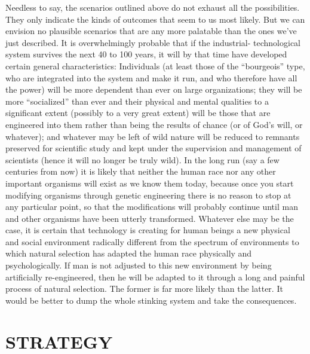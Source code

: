  Needless to say, the scenarios outlined above do not exhaust all the possibilities. They only indicate the kinds of outcomes that seem to us most likely. But we can envision no plausible scenarios that are any more palatable than the ones we’ve just described. It is overwhelmingly probable that if the industrial- technological system survives the next 40 to 100 years, it will by that time have developed certain general characteristics: Individuals (at least those of the “bourgeois” type, who are integrated into the system and make it run, and who therefore have all the power) will be more dependent than ever on large organizations; they will be more “socialized” than ever and their physical and mental qualities to a significant extent (possibly to a very great extent) will be those that are engineered into them rather than being the results of chance (or of God’s will, or whatever); and whatever may be left of wild nature will be reduced to remnants preserved for scientific study and kept under the supervision and management of scientists (hence it will no longer be truly wild). In the long run (say a few centuries from now) it is likely that neither the human race nor any other important organisms will exist as we know them today, because once you start modifying organisms through genetic engineering there is no reason to stop at any particular point, so that the modifications will probably continue until man and other organisms have been utterly transformed.
 Whatever else may be the case, it is certain that technology is creating for human beings a new physical and social environment radically different from the spectrum of environments to which natural selection has adapted the human race physically and psychologically. If man is not adjusted to this new environment by being artificially re-engineered, then he will be adapted to it through a long and painful process of natural selection. The former is far more likely than the latter.\break
{} It would be better to dump the whole stinking system and take the consequences.

\chapter{STRATEGY}

